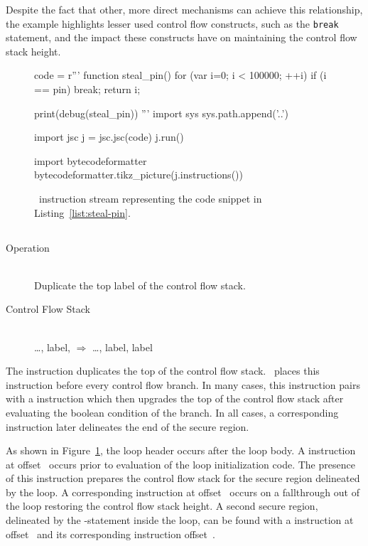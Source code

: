 Despite the fact that other, more direct mechanisms can achieve this relationship, the example highlights lesser used control flow constructs, such as the \texttt{break} statement, and the impact these constructs have on maintaining the control flow stack height.

\begin{figure}[h]
\begin{python}
code = r'''
function steal_pin() {
  for (var i=0; i < 100000; ++i) {
    if (i == pin) break;
  }
  return i;
}

print(debug(steal_pin))
'''
import sys
sys.path.append('..')

import jsc
j = jsc.jsc(code)
j.run()

import bytecodeformatter
bytecodeformatter.tikz_picture(j.instructions())
\end{python}
  \caption{\FlowCore\ instruction stream representing the code snippet in Listing~\ref{list:steal-pin}.}
  \label{fig:steal-pin-bytecode}
\end{figure}

\subsection{\dup}

\begin{samepage}
\begin{description}
  \item[Operation] \hfill \\
    Duplicate the top label of the control flow stack.
  \item[Control Flow Stack] \hfill \\
    \ldots, label, $\Rightarrow$ \ldots, label, label
\end{description}
\end{samepage}

The \dup instruction duplicates the top of the control flow stack.
\FlowCore\ places this instruction before every control flow branch.
In many cases, this instruction pairs with a \join instruction which then upgrades the top of the control flow stack after evaluating the boolean condition of the branch.
In all cases, a corresponding \popj instruction later delineates the end of the secure region.

As shown in Figure~\ref{fig:steal-pin-bytecode}, the loop header occurs after the loop body.
A \dup instruction at offset~ occurs prior to evaluation of the loop initialization code.
The presence of this instruction prepares the control flow stack for the secure region delineated by the loop.
A corresponding \popj instruction at offset~ occurs on a fallthrough out of the loop restoring the control flow stack height.
A second secure region, delineated by the -statement inside the loop, can be found with a \dup instruction at offset~ and its corresponding \popj instruction offset~.

